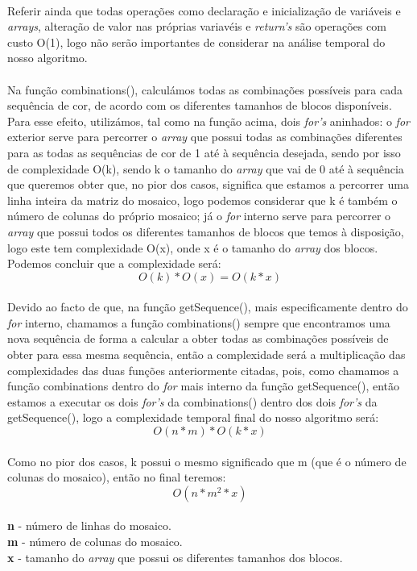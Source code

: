 \documentclass[12pt]{article}
\begin{document}
\paragraph{}
Referir ainda que todas operações como declaração e inicialização de variáveis e \textit{arrays}, alteração de valor nas próprias variavéis e \textit{return's} são operações com custo O(1), logo não serão importantes de considerar na análise temporal do nosso algoritmo.
\paragraph{}
Na função combinations(), calculámos todas as combinações possíveis para cada sequência de cor, de acordo com os diferentes tamanhos de blocos disponíveis. Para esse efeito, utilizámos, tal como na função acima, dois \textit{for's} aninhados: o \textit{for} exterior serve para percorrer o \textit{array} que possui todas as combinações diferentes para as todas as sequências de cor de 1 até à sequência desejada, sendo por isso de complexidade O(k), sendo k o tamanho do \textit{array} que vai de 0 até à sequência que queremos obter que, no pior dos casos, significa que estamos a percorrer uma linha inteira da matriz do mosaico, logo podemos considerar que k é também o número de colunas do próprio mosaico; já o \textit{for} interno serve para percorrer o \textit{array} que possui todos os diferentes tamanhos de blocos que temos à disposição, logo este tem complexidade O(x), onde x é o tamanho do \textit{array} dos blocos. Podemos concluir que a complexidade será:
\begin{equation}
O(k) * O(x) = O(k*x)
\end{equation}
\paragraph{}
Devido ao facto de que, na função getSequence(), mais especificamente dentro do \textit{for} interno, chamamos a função combinations() sempre que encontramos uma nova sequência de forma a calcular a obter todas as combinações possíveis de obter para essa mesma sequência, então a complexidade será a multiplicação das complexidades das duas funções anteriormente citadas, pois, como chamamos a função combinations dentro do \textit{for} mais interno da função getSequence(), então estamos a executar os dois \textit{for's} da combinations() dentro dos dois \textit{for's} da getSequence(), logo a complexidade temporal final do nosso algoritmo será:
\begin{equation}
O(n*m) * O(k*x)
\end{equation}
\\ Como no pior dos casos, k possui o mesmo significado que m (que é o número de colunas do mosaico), então no final teremos:
\begin{equation}
O(n*m^{2}*x)
\end{equation}
\\ \textbf{n} - número de linhas do mosaico.
\\ \textbf{m} - número de colunas do mosaico.
\\ \textbf{x} - tamanho do \textit{array} que possui os diferentes tamanhos dos blocos.
\end{document}
